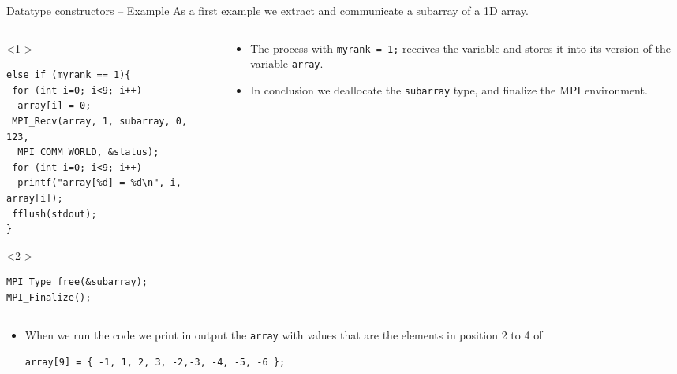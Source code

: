 \documentclass[xcolor={svgnames,usenames}]{beamer}
\begin{document}
\begin{frame}[fragile]{Datatype constructors -- Example}
As a first example we extract and communicate a subarray of a 1D array.
\begin{columns}
\begin{column}{0.55\textwidth}
\footnotesize
\begin{onlyenv}<1->
\begin{verbatim}
else if (myrank == 1){
 for (int i=0; i<9; i++)
  array[i] = 0;
 MPI_Recv(array, 1, subarray, 0, 123, 
  MPI_COMM_WORLD, &status);
 for (int i=0; i<9; i++)
  printf("array[%d] = %d\n", i, array[i]);
 fflush(stdout);
}
\end{verbatim}
\end{onlyenv}
\begin{onlyenv}<2->
\begin{verbatim}
MPI_Type_free(&subarray);
MPI_Finalize();
\end{verbatim}
\end{onlyenv}
\end{column}
\begin{column}{0.45\textwidth}
\begin{itemize}
\item<1-> The process with \texttt{myrank = 1;} receives the variable and stores it into its version of the variable \texttt{array}.
\item<2-> In conclusion we deallocate the \texttt{subarray} type, and finalize the MPI environment.
\end{itemize}
\end{column}
\end{columns}
\begin{itemize}
	\item<3-> When we run the code we print in output the \texttt{array} with values
	that are the elements in position 2 to 4 of
	\begin{center}
	\verb|array[9] = { -1, 1, 2, 3, -2,-3, -4, -5, -6 };|
	\end{center}
\end{itemize}
\end{frame}
\end{document}
